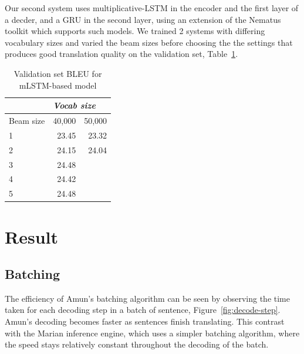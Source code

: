 \documentclass[11pt,a4paper]{article}
\begin{document}
Our second system uses multiplicative-LSTM in the encoder and the first layer of a decder, and a GRU in the second layer, using an extension of the Nematus~\citep{sennrich-EtAl:2017:EACLDemo} toolkit which supports such models. We trained 2 systems with differing vocabulary sizes and varied the beam sizes before choosing the the settings that produces good translation quality on the validation set, Table~\ref{tab:mLSTM BLEU - vocab sizes}. 

\begin{table}
\begin{center}
\begin{tabular}{|l|r|r|} \hline
		& \multicolumn{2}{|l|}{\emph{Vocab size}}	\\ \hline	
Beam size	& 40,000	& 50,000 \\ \hline
1 		& 23.45		& 23.32	\\ 
2		& 24.15		& 24.04	\\
3		& 24.48		&  	\\
4		& 24.42		& 	\\
5		& 24.48		& 	\\ \hline
\end{tabular}
\end{center}
\caption{Validation set BLEU for mLSTM-based model}
\label{tab:mLSTM BLEU - vocab sizes}
\end{table}

\section{Result}
\label{sec:Result}

\subsection{Batching}

The efficiency of Amun's batching algorithm can be seen by observing the time taken for each decoding step in a batch of sentence, Figure~\ref{fig:decode-step}. Amun's decoding becomes faster as sentences finish translating. This contrast with the Marian inference engine, which uses a simpler batching algorithm, where the speed stays relatively constant throughout the decoding of the batch.
\end{document}
